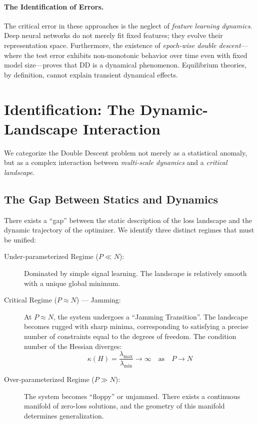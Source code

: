 \documentclass[
  journal=largetwo,
  year=2025,
  volume=37,
]{cup-journal}
\begin{document}
\paragraph{The Identification of Errors.} The critical error in these approaches is the neglect of \textit{feature learning dynamics}. Deep neural networks do not merely fit fixed features; they evolve their representation space. Furthermore, the existence of \textit{epoch-wise double descent}---where the test error exhibits non-monotonic behavior over time even with fixed model size---proves that DD is a dynamical phenomenon. Equilibrium theories, by definition, cannot explain transient dynamical effects.

\section{Identification: The Dynamic-Landscape Interaction}

We categorize the Double Descent problem not merely as a statistical anomaly, but as a complex interaction between \textit{multi-scale dynamics} and a \textit{critical landscape}.

\subsection{The Gap Between Statics and Dynamics}

There exists a ``gap'' between the static description of the loss landscape and the dynamic trajectory of the optimizer. We identify three distinct regimes that must be unified:

\begin{description}
    \item[Under-parameterized Regime ($P \ll N$):] Dominated by simple signal learning. The landscape is relatively smooth with a unique global minimum.
    
    \item[Critical Regime ($P \approx N$) --- Jamming:] At $P \approx N$, the system undergoes a ``Jamming Transition''. The landscape becomes rugged with sharp minima, corresponding to satisfying a precise number of constraints equal to the degrees of freedom. The condition number of the Hessian diverges:
    \begin{equation}
        \kappa(H) = \frac{\lambda_{\max}}{\lambda_{\min}} \to \infty \quad \text{as} \quad P \to N
    \end{equation}
    
    \item[Over-parameterized Regime ($P \gg N$):] The system becomes ``floppy'' or unjammed. There exists a continuous manifold of zero-loss solutions, and the geometry of this manifold determines generalization.
\end{description}
\end{document}

